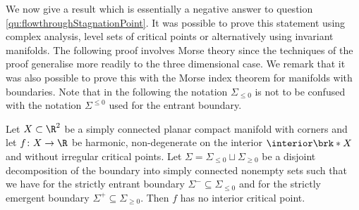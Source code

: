 We now give a result which is essentially a negative answer to question \ref{qu:flowthroughStagnationPoint}.
It was possible to prove this statement using complex analysis, level sets of critical points or alternatively using invariant manifolds.
The following proof involves Morse theory since the techniques of the proof generalise more readily to the three dimensional case.
We remark that it was also possible to prove this with the Morse index theorem for manifolds with boundaries.
Note that in the following the notation $\Sigma_{\leq0}$ is not to be confused with the notation $\Sigma^{\leq0}$ used for the
entrant boundary.
\begin{proposition}[Negative answer to question \ref{qu:flowthroughStagnationPoint} in $d=2$ dimensions]\label{pr:n2_negativeResult}
  Let $X\subset\R^2$ be a simply connected planar compact manifold with corners and let $f\colon X\to\R$ be harmonic, non-degenerate on the interior
  $\interior\brk*{X}$ and without irregular critical points.
  Let $\Sigma=\Sigma_{\leq0}\sqcup\Sigma_{\geq0}$ be a disjoint decomposition of the boundary into simply connected nonempty sets such that
  we have for the strictly entrant boundary $\Sigma^-\subseteq\Sigma_{\leq0}$ and for the strictly emergent boundary $\Sigma^+\subseteq\Sigma_{\geq0}$.
  Then $f$ has no interior critical point.
\end{proposition}

